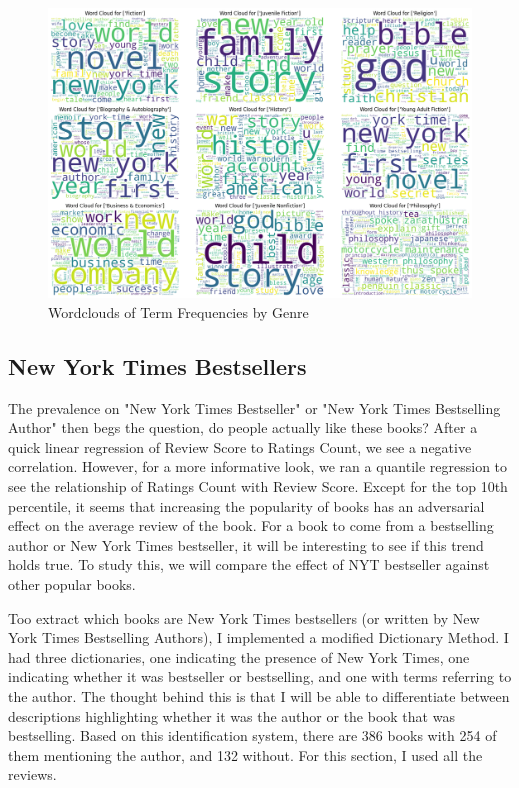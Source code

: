 \documentclass[12pt]{article}
\numberwithin{equation}{section}
\begin{document}
\begin{figure}[hb]
    \centering
    \includegraphics[width = \textwidth]{genre_wordclouds.png}
\caption{Wordclouds of Term Frequencies by Genre} 
\end{figure}

\subsection{New York Times Bestsellers}

The prevalence on "New York Times Bestseller" or "New York Times Bestselling Author" then begs the question, do people actually like these books? After a quick linear regression of Review Score to Ratings Count, we see a negative correlation. However, for a more informative look, we ran a quantile regression to see the relationship of Ratings Count with Review Score. Except for the top 10th percentile, it seems that increasing the popularity of books has an adversarial effect on the average review of the book. For a book to come from a bestselling author or New York Times bestseller, it will be interesting to see if this trend holds true. To study this, we will compare the effect of NYT bestseller against other popular books.

Too extract which books are New York Times bestsellers (or written by New York Times Bestselling Authors), I implemented a modified Dictionary Method. I had three dictionaries, one indicating the presence of New York Times, one indicating whether it was bestseller or bestselling, and one with terms referring to the author. The thought behind this is that I will be able to differentiate between descriptions highlighting whether it was the author or the book that was bestselling. Based on this identification system, there are 386 books with 254 of them mentioning the author, and 132 without. For this section, I used all the reviews.
\end{document}
